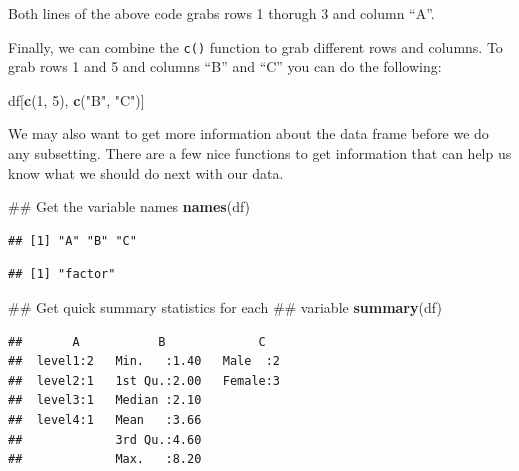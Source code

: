 \documentclass[]{tufte-book}
\newenvironment{Shaded}{}{}
\newcommand{\KeywordTok}[1]{\textcolor[rgb]{0.00,0.44,0.13}{\textbf{#1}}}
\newcommand{\DecValTok}[1]{\textcolor[rgb]{0.25,0.63,0.44}{#1}}
\newcommand{\StringTok}[1]{\textcolor[rgb]{0.25,0.44,0.63}{#1}}
\newcommand{\OperatorTok}[1]{\textcolor[rgb]{0.40,0.40,0.40}{#1}}
\newcommand{\NormalTok}[1]{#1}
\theoremstyle{definition}
\theoremstyle{definition}
\theoremstyle{remark}
\begin{document}
Both lines of the above code grabs rows 1 thorugh 3 and column ``A''.

Finally, we can combine the \texttt{c()} function to grab different rows
and columns. To grab rows 1 and 5 and columns ``B'' and ``C'' you can do
the following:

\begin{Shaded}
\begin{Highlighting}[]
\NormalTok{df[}\KeywordTok{c}\NormalTok{(}\DecValTok{1}\NormalTok{, }\DecValTok{5}\NormalTok{), }\KeywordTok{c}\NormalTok{(}\StringTok{"B"}\NormalTok{, }\StringTok{"C"}\NormalTok{)]}
\end{Highlighting}
\end{Shaded}

We may also want to get more information about the data frame before we
do any subsetting. There are a few nice functions to get information
that can help us know what we should do next with our data.

\begin{Shaded}
\begin{Highlighting}[]
\NormalTok{## Get the variable names}
\KeywordTok{names}\NormalTok{(df)}
\end{Highlighting}
\end{Shaded}

\begin{verbatim}
## [1] "A" "B" "C"
\end{verbatim}

\begin{Shaded}
\end{Shaded}

\begin{verbatim}
## [1] "factor"
\end{verbatim}

\begin{Shaded}
\begin{Highlighting}[]
\NormalTok{## Get quick summary statistics for each}
\NormalTok{## variable}
\KeywordTok{summary}\NormalTok{(df)}
\end{Highlighting}
\end{Shaded}

\begin{verbatim}
##       A           B             C    
##  level1:2   Min.   :1.40   Male  :2  
##  level2:1   1st Qu.:2.00   Female:3  
##  level3:1   Median :2.10             
##  level4:1   Mean   :3.66             
##             3rd Qu.:4.60             
##             Max.   :8.20
\end{verbatim}
\end{document}
